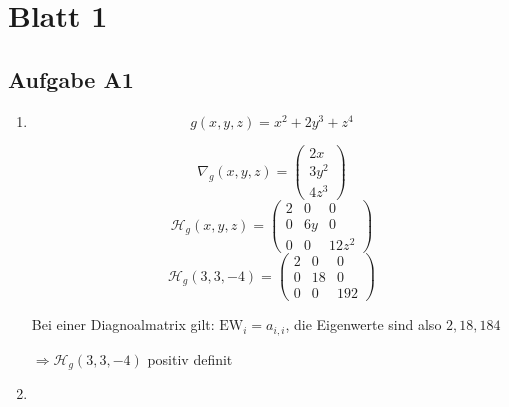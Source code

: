 \documentclass[fleqn,13pt]{scrartcl}
\begin{document}
\section*{Blatt 1}
\subsection*{Aufgabe A1}

\begin{enumerate}
	\item
		\begin{equation*}
			g(x,y,z) = x^2 + 2y^3 + z^4 
		\end{equation*}

		\begin{equation*}
			\nabla_g(x,y,z) =
			\begin{pmatrix}
				2x \\
				3y^2 \\
				4z^3
			\end{pmatrix}
		\end{equation*}
		\begin{equation*}
			\mathcal{H}_g(x,y,z) =
			\begin{pmatrix}
				2 & 0 & 0 \\
				0 & 6y & 0 \\
				0 & 0 & 12z^2
			\end{pmatrix}
		\end{equation*}
		\begin{equation*}
			\mathcal{H}_g(3,3,-4) =
			\begin{pmatrix}
				2 & 0 & 0 \\
				0 & 18 & 0 \\
				0 & 0 & 192
			\end{pmatrix}
		\end{equation*}

		Bei einer Diagnoalmatrix gilt: $\text{EW}_i = a_{i,i}$, die Eigenwerte sind also $2, 18, 184$

		$\Rightarrow \mathcal{H}_g(3,3,-4)$ positiv definit

	\item


\end{enumerate}
\end{document}
